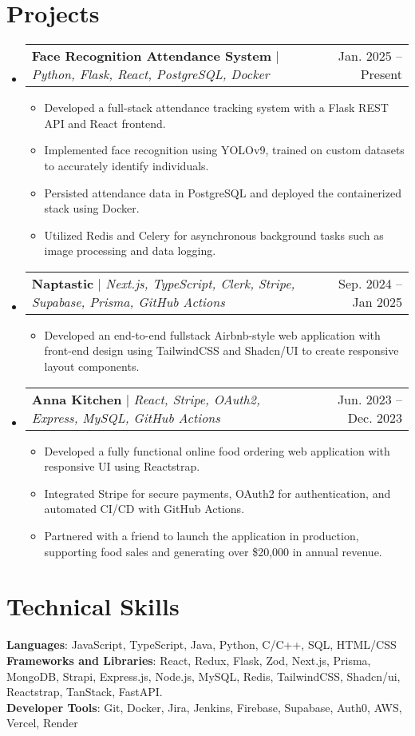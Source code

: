 \documentclass[letterpaper,11pt]{article}
\makeatletter
\newcommand{\resumeItem}[1]{
  \item\small{
    {#1 \vspace{-2pt}}
  }
}
\newcommand{\resumeProjectHeading}[2]{
    \item
    \begin{tabular*}{0.97\textwidth}{l@{\extracolsep{\fill}}r}
      \small#1 & #2 \\
    \end{tabular*}\vspace{-7pt}
}
\newcommand{\resumeSubHeadingListStart}{\begin{itemize}[leftmargin=0.15in, label={}]}
\newcommand{\resumeSubHeadingListEnd}{\end{itemize}}
\newcommand{\resumeItemListStart}{\begin{itemize}}
\newcommand{\resumeItemListEnd}{\end{itemize}\vspace{-5pt}}
\makeatother
\begin{document}
\section{Projects}
    \resumeSubHeadingListStart
      \resumeProjectHeading
          {\textbf{Face Recognition Attendance System} $|$ \emph{Python, Flask, React, PostgreSQL, Docker}}{Jan. 2025 -- Present}
            \resumeItemListStart
            \resumeItem{Developed a full-stack attendance tracking system with a Flask REST API and React frontend.}
            \resumeItem{Implemented face recognition using YOLOv9, trained on custom datasets to accurately identify individuals.}
            \resumeItem{Persisted attendance data in PostgreSQL and deployed the containerized stack using Docker.}
            \resumeItem{Utilized Redis and Celery for asynchronous background tasks such as image processing and data logging.}
        \resumeItemListEnd
      \resumeProjectHeading
          {\textbf{Naptastic} $|$ \emph{Next.js, TypeScript, Clerk, Stripe, Supabase, Prisma, GitHub Actions}}{Sep. 2024 -- Jan 2025}
          \resumeItemListStart
            \resumeItem{Developed an end-to-end fullstack Airbnb-style web application with front-end design using TailwindCSS and Shadcn/UI to create responsive layout components.}
          \resumeItemListEnd
      \resumeProjectHeading
          {\textbf{Anna Kitchen} $|$ \emph{React, Stripe, OAuth2, Express, MySQL, GitHub Actions}}{Jun. 2023 -- Dec. 2023}
        \resumeItemListStart
            \resumeItem{Developed a fully functional online food ordering web application with responsive UI using Reactstrap.}
            \resumeItem{Integrated Stripe for secure payments, OAuth2 for authentication, and automated CI/CD with GitHub Actions.}
            \resumeItem{Partnered with a friend to launch the application in production, supporting food sales and generating over \$20,000 in annual revenue.}
        \resumeItemListEnd
    \resumeSubHeadingListEnd

\section{Technical Skills}
 \begin{itemize}[leftmargin=0.15in, label={}]
    \small{\item{
     \textbf{Languages}{: JavaScript, TypeScript, Java, Python, C/C++, SQL, HTML/CSS} \\
     \textbf{Frameworks and Libraries}{: React, Redux, Flask, Zod, Next.js, Prisma, MongoDB, Strapi, Express.js, Node.js, MySQL, Redis, TailwindCSS, Shadcn/ui, Reactstrap, TanStack, FastAPI.} \\
     \textbf{Developer Tools}{: Git, Docker, Jira, Jenkins, Firebase, Supabase, Auth0, AWS, Vercel, Render} \\
    }}
 \end{itemize}
\end{document}
